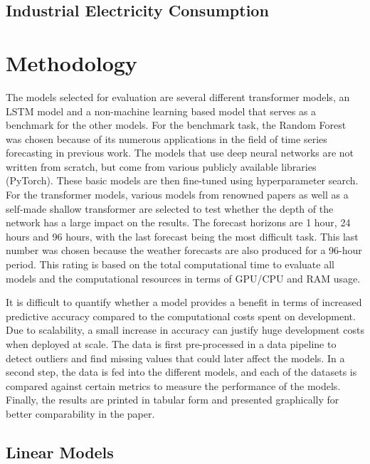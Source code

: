 \documentclass{article}
\begin{document}
\subsection{Industrial Electricity Consumption}






\section{Methodology}

The models selected for evaluation are several different transformer models, an LSTM model and a non-machine learning based model that serves as a benchmark for the other models. For the benchmark task, the Random Forest was chosen because of its numerous applications in the field of time series forecasting in previous work. The models that use deep neural networks are not written from scratch, but come from various publicly available libraries (PyTorch). These basic models are then fine-tuned using hyperparameter search. For the transformer models, various models from renowned papers as well as a self-made shallow transformer are selected to test whether the depth of the network has a large impact on the results. The forecast horizons are 1 hour, 24 hours and 96 hours, with the last forecast being the most difficult task. This last number was chosen because the weather forecasts are also produced for a 96-hour period. This rating is based on the total computational time to evaluate all models and the computational resources in terms of GPU/CPU and RAM usage.\par 

It is difficult to quantify whether a model provides a benefit in terms of increased predictive accuracy compared to the computational costs spent on development. Due to scalability, a small increase in accuracy can justify huge development costs when deployed at scale. The data is first pre-processed in a data pipeline to detect outliers and find missing values that could later affect the models. In a second step, the data is fed into the different models, and each of the datasets is compared against certain metrics to measure the performance of the models. Finally, the results are printed in tabular form and presented graphically for better comparability in the paper.

\subsection{Linear Models}
\end{document}
